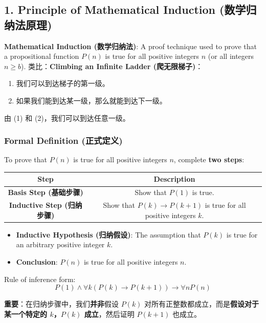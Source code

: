 \documentclass[10pt,a4paper,openany]{ctexbook}
\theoremstyle{definition}
\theoremstyle{remark}
\renewenvironment{quote}
  {\list{}{\leftmargin=1em\rightmargin=0pt\topsep=0.5pt\partopsep=0pt}\item[]}
  {\endlist}
\begin{document}
\vspace{-2pt}

\subsection{1. Principle of Mathematical Induction (数学归纳法原理)}

\textbf{Mathematical Induction (数学归纳法)}: A proof technique used to prove that a propositional function $P(n)$ is true for all positive integers $n$ (or all integers $n \ge b$).
类比：\textbf{Climbing an Infinite Ladder (爬无限梯子)}：
\begin{enumerate}
\item 我们可以到达梯子的第一级。
\item 如果我们能到达某一级，那么就能到达下一级。
\end{enumerate}

由 (1) 和 (2)，我们可以到达任意一级。
\subsubsection{Formal Definition (正式定义)}

To prove that $P(n)$ is true for all positive integers $n$, complete \textbf{two steps}:
\begin{center}
\begin{tabular}{cc}
\hline
Step & Description \\ \hline
\textbf{Basis Step (基础步骤)} & Show that $P(1)$ is true. \\
\textbf{Inductive Step (归纳步骤)} & Show that $P(k) \to P(k+1)$ is true for all positive integers $k$. \\
\hline
\end{tabular}

\end{center}

\begin{itemize}
\item \textbf{Inductive Hypothesis (归纳假设)}: The assumption that $P(k)$ is true for an arbitrary positive integer $k$.
\item \textbf{Conclusion}: $P(n)$ is true for all positive integers $n$.

\end{itemize}

Rule of inference form:
\[
P(1) \land \forall k (P(k) \to P(k+1)) \to \forall n P(n)
\]

\begin{quote}
\textbf{重要}：在归纳步骤中，我们\textbf{并非}假设 $P(k)$ 对所有正整数都成立，而是\textbf{假设对于某一个特定的 $k$，$P(k)$ 成立}，然后证明 $P(k+1)$ 也成立。

\end{quote}
\end{document}
